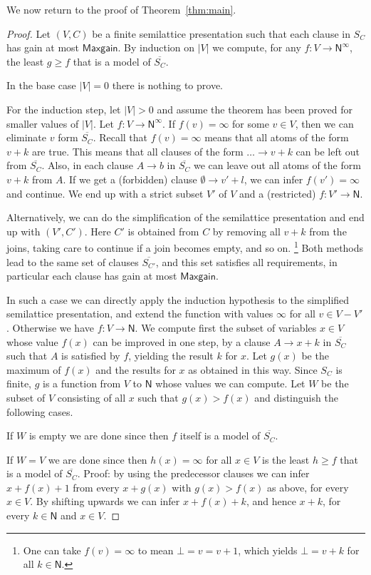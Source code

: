 \documentclass[11pt,a4paper]{article}
\newcommand{\N}{\mathsf{N}}
\newcommand\Ninf{\N^\infty}
\newcommand\M{\mathsf{Maxgain}}
\newcommand\upS[1]{\overline{S_{#1}}}
\begin{document}
We now return to the proof of Theorem~\ref{thm:main}.

\begin{proof}
Let  $(V,C)$ be a finite semilattice presentation
such that each clause in $S_C$ has gain at most $\M$.
By induction on $|V|$ we compute, for any $f: V\to\Ninf$,
the least $g \geq f$ that is a model of $\upS{C}$.

In the base case $|V|=0$ there is nothing to prove.

For the induction step, let $|V|>0$ and assume the
theorem has been proved for smaller values of $|V|$.
Let $f: V\to\Ninf$. If $f(v)=\infty$ for some $v\in V$,
then we can eliminate $v$ form $\upS{C}$. Recall that
$f(v)=\infty$ means that all atoms of the form $v+k$
are true. This means that all clauses of the form
$\ldots\to v+k$ can be left out from $\upS{C}$.
Also, in each clause $A\to b$ in $\upS{C}$
we can leave out all atoms of the form $v+k$ from $A$.
If we get a (forbidden) clause $\emptyset\to v'+l$,
we can infer $f(v')=\infty$ and continue.
We end up with a strict subset $V'$ of $V$ and a (restricted)
$f : V' \to \N$.

Alternatively, we can do the simplification of the semilattice
presentation and end up with $(V',C')$. Here $C'$
is obtained from $C$ by removing all $v+k$ from the joins,
taking care to continue if a join becomes empty, and so on.%
\footnote{One can take $f(v)=\infty$ to mean $\bot=v=v+1$,
which yields $\bot=v+k$ for all $k\in\N$.}
Both methods lead to the same set of clauses $\upS{C'}$,
and this set satisfies all requirements, in particular
each clause has gain at most $\M$.

In such a case we can directly apply the induction hypothesis
to the simplified semilattice presentation, and extend the
function with values $\infty$ for all $v \in V-V'$.
Otherwise we have $f: V\to\N$.
We compute first the subset of variables $x\in V$ 
whose value $f(x)$ can be improved in one step,
by a clause $A\to x+k$ in $\upS{C}$ such that $A$ is
satisfied by $f$, yielding the result $k$ for $x$. 
Let $g(x)$ be the maximum of $f(x)$ and the results
for $x$ as obtained in this way. Since $S_C$ is finite,
$g$ is a function from $V$ to $\N$ whose values we can
compute. Let $W$ be the subset of $V$ consisting of
all $x$ such that $g(x) > f(x)$ and distinguish the
following cases.

If $W$ is empty we are done since then $f$ itself 
is a model of $\upS{C}$.

If $W = V$ we are done since then $h(x) = \infty$ for all 
$x \in V$ is the least $h \geq f$ that is a model of $\upS{C}$.
Proof: by using the predecessor clauses we can infer
$x+f(x)+1$ from every $x+g(x)$ with $g(x)>f(x)$ as above,
for every $x\in V$. By shifting upwards we can infer
$x+f(x)+k$, and hence $x+k$, for every $k\in\N$ and $x\in V$.


\end{proof}
\end{document}
